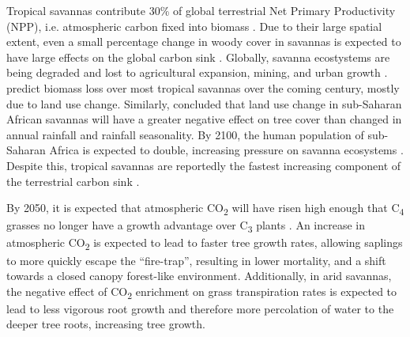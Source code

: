 \begin{refsection}
Tropical savannas contribute \textapprox{}30\% of global terrestrial Net Primary Productivity (NPP), i.e. atmospheric carbon fixed into biomass \citep{Grace2006}. Due to their large spatial extent, even a small percentage change in woody cover in savannas is expected to have large effects on the global carbon sink \citep{Williams2005}. Globally, savanna ecostystems are being degraded and lost to agricultural expansion, mining, and urban growth \citep{Parr2014}. \citet{Ross2021} predict biomass loss over most tropical savannas over the coming century, mostly due to land use change. Similarly, \citet{Aleman2016} concluded that land use change in sub-Saharan African savannas will have a greater negative effect on tree cover than changed in annual rainfall and rainfall seasonality. By 2100, the human population of sub-Saharan Africa is expected to double, increasing pressure on savanna ecosystems \citep{Pison2017}. Despite this, tropical savannas are reportedly the fastest increasing component of the terrestrial carbon sink \citep{Sitch2015}.

By 2050, it is expected that atmospheric CO\textsubscript{2} will have risen high enough that C\textsubscript{4} grasses no longer have a growth advantage over C\textsubscript{3} plants \citep{Bond2012}. An increase in atmospheric CO\textsubscript{2} is expected to lead to faster tree growth rates, allowing saplings to more quickly escape the ``fire-trap'', resulting in lower mortality, and a shift towards a closed canopy forest-like environment. Additionally, in arid savannas, the negative effect of CO\textsubscript{2} enrichment on grass transpiration rates \citep{Murphy2012} is expected to lead to less vigorous root growth and therefore more percolation of water to the deeper tree roots, increasing tree growth. 


\end{refsection}
